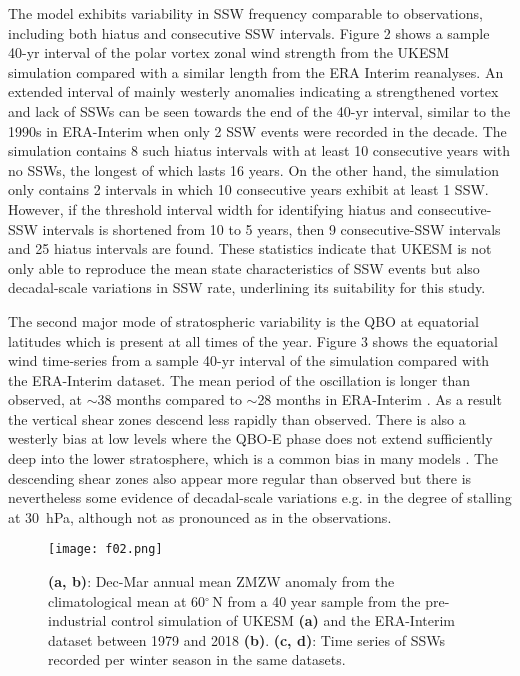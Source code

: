 \documentclass[wcd, manuscript]{copernicus}
\begin{document}
The model exhibits variability in SSW frequency comparable to observations, including both hiatus and consecutive SSW intervals. Figure 2 shows a sample 40-yr interval of the polar vortex zonal wind strength from the UKESM simulation compared with a similar length from the ERA Interim reanalyses. An extended interval of mainly westerly anomalies indicating a strengthened vortex and lack of SSWs can be seen towards the end of the 40-yr interval, similar to the 1990s in ERA-Interim when only 2 SSW events were recorded in the decade. The simulation contains 8 such hiatus intervals with at least 10 consecutive years with no SSWs, the longest of which lasts 16 years. On the other hand, the simulation only contains 2 intervals in which 10 consecutive years exhibit at least 1 SSW. However, if the threshold interval width for identifying hiatus and consecutive-SSW intervals is shortened from 10 to 5 years,  then 9 consecutive-SSW intervals and 25 hiatus intervals are found. These statistics indicate that UKESM is not only able to reproduce the mean state characteristics of SSW events but also decadal-scale variations in SSW rate, underlining its  suitability for this study. 

The second major mode of stratospheric variability is the QBO at equatorial latitudes which is present at all times of the year. Figure 3 shows the equatorial wind time-series from a sample 40-yr interval of the simulation compared with the ERA-Interim dataset. The mean period of the oscillation is longer than observed, at $\sim$38 months compared to $\sim$28 months in ERA-Interim \citep{Kawatani2016}. As a result the vertical shear zones descend less rapidly than observed. There is also a westerly bias at low levels where the QBO-E phase does not extend sufficiently deep into the lower stratosphere, which is a common bias in many models \citep{Bushell2020}. The descending shear zones also appear more regular than observed but there is nevertheless some evidence of decadal-scale variations e.g. in the degree of stalling at 30\ hPa, although not as pronounced as in the observations.

\begin{center}
\begin{figure}[h!]
\noindent\texttt{[image: f02.png]}
\caption{\textbf{(a, b)}: Dec-Mar annual mean ZMZW anomaly from the climatological mean at 60$^\circ$\,N from a 40 year sample from the pre-industrial control simulation of UKESM \textbf{(a)} and the ERA-Interim dataset between 1979 and 2018 \textbf{(b)}. \textbf{(c, d)}: Time series of SSWs recorded per winter season in the same datasets.}
\label{fig1}
\end{figure}
\end{center}
\end{document}
